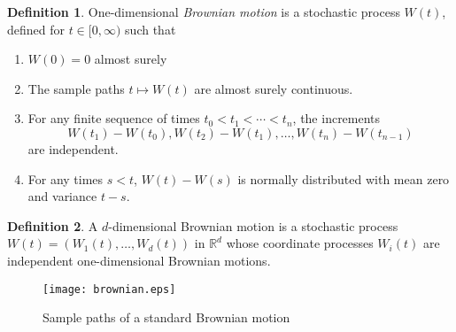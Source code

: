 \documentclass[12pt]{article}
\begin{document}
\theoremstyle{definition}
\newtheorem*{mydefn}{Definition}
\begin{mydefn}
One-dimensional \emph{Brownian motion} is a stochastic process $W(t)$, defined for $t\in [0,\infty)$ such that
\begin{enumerate}
\item $W(0) = 0$ almost surely
\item The sample paths $t \mapsto W(t)$ are almost surely continuous.
\item For any finite sequence of times $t_0 < t_1 < \cdots <t_n$,
the increments 
\[
W(t_1)-W(t_0), W(t_2)-W(t_1), \dotsc, W(t_n)-W(t_{n-1})
\]
are independent.
\item
For any times $s < t$, $W(t)-W(s)$ is normally distributed with mean zero
and variance $t-s$.
\end{enumerate}
\end{mydefn}

\begin{mydefn}
A $d$-dimensional Brownian motion is a stochastic process 
$W(t) = (W_1(t), \dots, W_d(t))$ in 
$\mathbb{R}^d$ whose coordinate processes $W_i(t)$ are 
independent one-dimensional Brownian motions.
\end{mydefn}

\begin{figure}
\texttt{[image: brownian.eps]}
\caption{Sample paths of a standard Brownian motion}
\end{figure}


\end{document}
